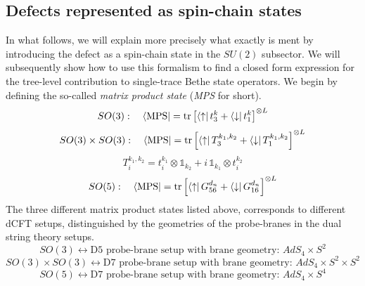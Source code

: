 \subsection{Defects represented as spin-chain states}
In what follows, we will explain more precisely what exactly is ment by introducing the defect as a spin-chain state in the $SU(2)$ subsector. We will subsequently show how to use this formalism to find a closed form expression for the tree-level contribution to single-trace Bethe state operators. We begin by defining the so-called \textit{matrix product state} (\textit{MPS} for short).
%
%
\begin{equation}
SO(3) : \quad
\bra{\text{MPS}}
=
\tr \left[
\bra{\uparrow} t^{k}_3
+ \bra{\downarrow} t^{k}_1
\right]^{\otimes L}
\end{equation}
%
%
\begin{equation}
SO(3) \times SO(3) : \quad
\bra{\text{MPS}}
=
\tr \left[
\bra{\uparrow} T^{k_1,k_2}_3
+ \bra{\downarrow} T^{k_1,k_2}_1
\right]^{\otimes L}
\end{equation}
%
%
\begin{equation}
T^{k_1,k_2}_i = t_i^{k_1} \otimes \mathbb{1}_{k_2} + i \, \mathbb{1}_{k_1} \otimes t_i^{k_2}
\end{equation}
%
%
\begin{equation}
SO(5) : \quad
\bra{\text{MPS}}
=
\tr \left[
\bra{\uparrow} G_{56}^{d_n}
+ \bra{\downarrow} G_{16}^{d_n}
\right]^{\otimes L}
\end{equation}
%
%
The three different matrix product states listed above, corresponds to different dCFT setups, distinguished by the geometries of the probe-branes in the dual string theory setups.
%
%
\begin{equation*}
SO(3) \leftrightarrow \text{D5 probe-brane setup with brane geometry: } AdS_4 \times S^2
\end{equation*}
%
%
\begin{equation*}
SO(3) \times SO(3) \leftrightarrow \text{D7 probe-brane setup with brane geometry: }
AdS_4 \times S^2 \times S^2
\end{equation*}
%
%
\begin{equation*}
SO(5) \leftrightarrow \text{D7 probe-brane setup with brane geometry: } AdS_4 \times S^4
\end{equation*}
%
%


